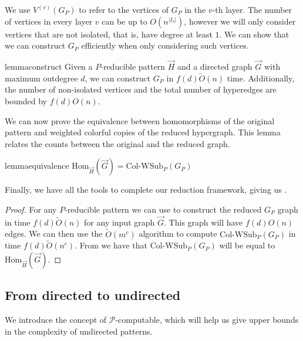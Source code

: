 \documentclass[a4paper,UKenglish,cleveref, autoref, numberwithinsect, thm-restate]{lipics-v2021}
\newcommand{\reducible}[1]{${#1}$-reducible}
\newcommand{\computable}[1]{${#1}$-computable}
\newcommand{\reduced}[1]{G_{#1}}
\newcommand{\maxoutdeg}{d}
\newcommand{\WSub}[2]{\mathrm{\text{Col-WSub}}_{#2}(#1)}
\newcommand{\Hom}[2]{\mathrm{Hom}_{#2}(#1)}
\newcommand{\cP}{\mathcal{P}}
\begin{document}
	We use $V^{(v)}(\reduced{P})$ to refer to the vertices of $\reduced{P}$ in the $v$-th layer. 
	The number of vertices in every layer $v$ can be up to $O(n^{|I_v|})$, however we will only consider vertices that are not isolated, that is, have degree at least $1$. We can show that we can construct $\reduced{P}$ efficiently when only considering such vertices.
	
	\begin{restatable}{lemma}{construct} \label{lem:construct_reduced_graph} 
		Given a \reducible{P} pattern $\vec{H}$ and a directed graph $\vec{G}$ with maximum outdegree $\maxoutdeg$, we can construct $\reduced{P}$ in $f(\maxoutdeg)\tilde{O}(n)$ time. Additionally, the number of non-isolated vertices and the total number of hyperedges are bounded by $f(\maxoutdeg)O(n)$.
	\end{restatable}


	We can now prove the equivalence between homomorphisms of the original pattern and weighted colorful copies of the reduced hypergraph. This lemma relates the counts between the original and the reduced graph.

	\begin{restatable}{lemma}{equivalence}\label{lem:equivalence_reduction}
		$
		\Hom{\vec{G}}{\vec{H}} = \WSub{\reduced{P}}{P}
		$
	\end{restatable}


	Finally, we have all the tools to complete our reduction framework, giving us .
	
	\maindirected*
	\begin{proof}
		For any \reducible{P} pattern we can use  to construct the reduced $\reduced{P}$ graph in time $f(\maxoutdeg)\tilde{O}(n)$ for any input graph $\vec{G}$. This graph will have $f(\maxoutdeg)O(n)$ edges. We can then use the $\tilde{O}(m^{c})$ algorithm to compute $\WSub{\reduced{P}}{P}$ in time $f(\maxoutdeg)\tilde{O}(n^{c})$. From  we have that $\WSub{\reduced{P}}{P}$ will be equal to $\Hom{\vec{G}}{\vec{H}}$.	
	\end{proof}

	\subsection{From directed to undirected}
	
	We introduce the concept of \computable{\cP}, which will help us give upper bounds in the complexity of undirected patterns.
	
\end{document}
